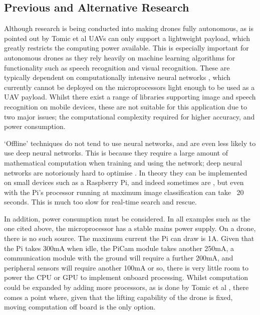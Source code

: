 \documentclass{article}
\begin{document}
\subsection{Previous and Alternative Research}
Although research is being conducted into making drones fully autonomous, as is pointed out by Tomic et al  \cite{Autonomous} UAVs can only support a lightweight payload, which greatly restricts the computing power available. This is especially important for autonomous drones as they rely heavily on machine learning algorithms for functionality such as speech recognition and visual recognition. These are typically dependent on computationally intensive neural networks \cite{Neural}, which currently cannot be deployed on the microprocessors light enough to be used as a UAV payload. Whilst there exist a range of libraries supporting image and speech recognition on mobile devices, these are not suitable for this application due to two major issues; the computational complexity required for higher accuracy, and power consumption. 

`Offline' techniques do not tend to use neural networks, and are even less likely to use deep neural networks. This is because they require a large amount of mathematical computation when training and using the network; deep neural networks are notoriously hard to optimise \cite{DeepAI}. In theory they can be implemented on small devices such as a Raspberry Pi, and indeed sometimes are \cite{DeepPi}, but even with the Pi's processor running at maximum image classification can take ~20 seconds. This is much too slow for real-time search and rescue. 

In addition, power consumption must be considered. In all examples such as the one cited above, the microprocessor has a stable mains power supply. On a drone, there is no such source. The maximum current the Pi can draw is 1A. Given that the Pi takes 300mA when idle, the PiCam module takes another 250mA, a communication module with the ground will require a further 200mA, and peripheral sensors will require another 100mA or so, there is very little room to power the CPU or GPU to implement onboard processing. Whilst computation could be expanded by adding more processors, as is done by Tomic et al \cite{Autonomous}, there comes a point where, given that the lifting capability of the drone is fixed, moving computation off board is the only option.
\end{document}
